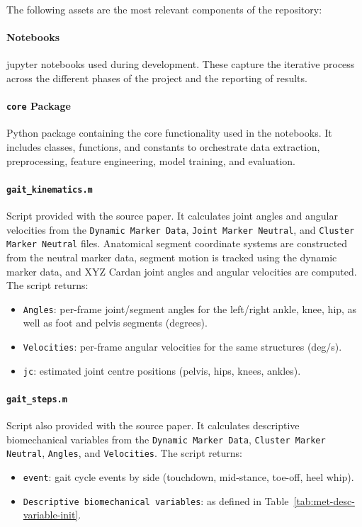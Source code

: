 The following assets are the most relevant components of the repository:

\paragraph{Notebooks}
\Gls{jupyter} notebooks used during development. These capture the iterative process across the different phases of the project and the reporting of results.

\paragraph{\texttt{core} Package}
Python package containing the core functionality used in the notebooks. It includes classes, functions, and constants to orchestrate data extraction, preprocessing, feature engineering, model training, and evaluation.

\paragraph{\texttt{gait\_kinematics.m}}
Script provided with the source paper. It calculates joint angles and angular velocities from the \texttt{Dynamic Marker Data}, \texttt{Joint Marker Neutral}, and \texttt{Cluster Marker Neutral} files. Anatomical segment coordinate systems are constructed from the neutral marker data, segment motion is tracked using the dynamic marker data, and XYZ Cardan joint angles and angular velocities are computed. The script returns:
\begin{itemize}
    \item \texttt{Angles}: per-frame joint/segment angles for the left/right ankle, knee, hip, as well as foot and pelvis segments (degrees).
    \item \texttt{Velocities}: per-frame angular velocities for the same structures (deg/s).
    \item \texttt{jc}: estimated joint centre positions (pelvis, hips, knees, ankles).
\end{itemize}

\paragraph{\texttt{gait\_steps.m}}
Script also provided with the source paper. It calculates descriptive biomechanical variables from the \texttt{Dynamic Marker Data}, \texttt{Cluster Marker Neutral}, \texttt{Angles}, and \texttt{Velocities}. The script returns:
\begin{itemize}
    \item \texttt{event}: gait cycle events by side (touchdown, mid-stance, toe-off, heel whip).
    \item \texttt{Descriptive biomechanical variables}: as defined in Table~\ref{tab:met-desc-variable-init}.
\end{itemize}

